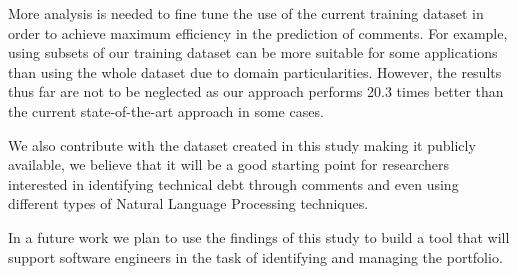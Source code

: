More analysis is needed to fine tune the use of the current training dataset in order to achieve maximum efficiency in the prediction of \SATD comments. For example, using subsets of our training dataset can be more suitable for some applications than using the whole dataset due to domain particularities. However, the results thus far are not to be neglected as our approach performs 20.3 times better than the current state-of-the-art approach in some cases.

We also contribute with the dataset created in this study making it publicly available, we believe that it will be a good starting point for researchers interested in identifying technical debt through comments and even using different types of Natural Language Processing techniques. 

In a future work we plan to use the findings of this study to build a tool that will support software engineers in the task of identifying and managing the \SATD portfolio. 

